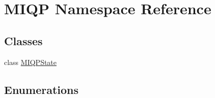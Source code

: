 \hypertarget{namespaceMIQP}{\section{\-M\-I\-Q\-P \-Namespace \-Reference}
\label{namespaceMIQP}
}
\subsection*{\-Classes}
\begin{DoxyCompactItemize}
\item 
class \hyperlink{classMIQP_1_1MIQPState}{\-M\-I\-Q\-P\-State}
\end{DoxyCompactItemize}
\subsection*{\-Enumerations}
